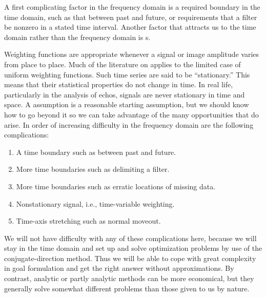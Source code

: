 \par
A first complicating factor in the frequency domain is a required boundary
in the time domain, such as that between past and future,
or requirements that a filter be nonzero in a stated time interval.
Another factor that attracts us to the time domain
rather than the frequency domain is s.
\par
Weighting functions
are appropriate whenever a signal or image amplitude varies
from place to place.
Much of the literature on 
applies to the limited case of uniform weighting functions.
Such time series are said to be ``stationary.''
This means that their statistical properties do not change in time.
In real life, particularly in the analysis of echos,
signals are never stationary in time and space.
A  assumption is a reasonable starting assumption,
but we should know how to go beyond it
so we can take advantage of the many opportunities that do arise.
In order of increasing difficulty in the frequency domain are
the following complications:
\begin{enumerate}
\item A time boundary such as between past and future.
\item More time boundaries such as delimiting a filter.
\item More time boundaries such as erratic locations of missing data.
\item Nonstationary signal, i.e., time-variable weighting.
\item Time-axis stretching such as normal moveout.
\end{enumerate}

\par
We will not have difficulty with any of these complications here,
because we will stay in the time domain
and set up and solve optimization problems by use of
the conjugate-direction method.
Thus we will be able to cope with great complexity in goal formulation
and get the right answer without approximations.
By contrast, analytic or partly analytic methods
can be more economical, but they generally solve
somewhat different problems than those given to us by nature.


